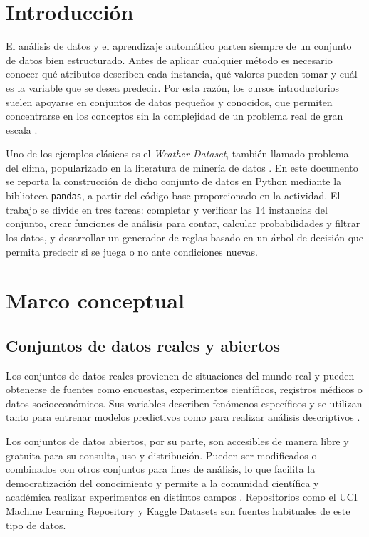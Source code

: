 \documentclass[11pt,letterpaper]{article}
\begin{document}
\portada
\indicegeneral


\section{Introducción}

El análisis de datos y el aprendizaje automático parten siempre de un conjunto de datos bien estructurado. Antes de aplicar cualquier método es necesario conocer qué atributos describen cada instancia, qué valores pueden tomar y cuál es la variable que se desea predecir. Por esta razón, los cursos introductorios suelen apoyarse en conjuntos de datos pequeños y conocidos, que permiten concentrarse en los conceptos sin la complejidad de un problema real de gran escala \parencite{tecnm2026_documento_fuente}.

Uno de los ejemplos clásicos es el \textit{Weather Dataset}, también llamado problema del clima, popularizado en la literatura de minería de datos \parencite{witten2017}. En este documento se reporta la construcción de dicho conjunto de datos en Python mediante la biblioteca \texttt{pandas}, a partir del código base proporcionado en la actividad. El trabajo se divide en tres tareas: completar y verificar las 14 instancias del conjunto, crear funciones de análisis para contar, calcular probabilidades y filtrar los datos, y desarrollar un generador de reglas basado en un árbol de decisión que permita predecir si se juega o no ante condiciones nuevas.

\section{Marco conceptual}

\subsection{Conjuntos de datos reales y abiertos}

Los conjuntos de datos reales provienen de situaciones del mundo real y pueden obtenerse de fuentes como encuestas, experimentos científicos, registros médicos o datos socioeconómicos. Sus variables describen fenómenos específicos y se utilizan tanto para entrenar modelos predictivos como para realizar análisis descriptivos \parencite{tecnm2026_documento_fuente}.

Los conjuntos de datos abiertos, por su parte, son accesibles de manera libre y gratuita para su consulta, uso y distribución. Pueden ser modificados o combinados con otros conjuntos para fines de análisis, lo que facilita la democratización del conocimiento y permite a la comunidad científica y académica realizar experimentos en distintos campos \parencite{tecnm2026_documento_fuente}. Repositorios como el UCI Machine Learning Repository y Kaggle Datasets son fuentes habituales de este tipo de datos.
\end{document}
